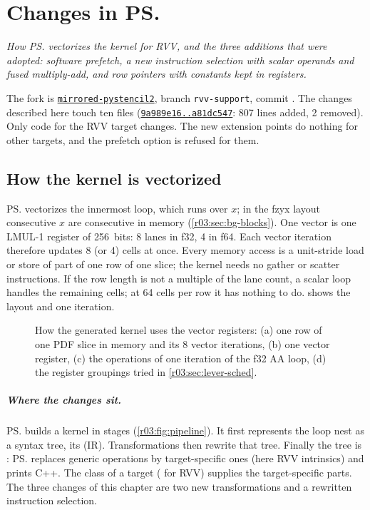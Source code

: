 \chapter{Changes in \texorpdfstring{\ps}{pystencils}}\label{r03:ch:pystencils}

\emph{How \ps{} vectorizes the kernel for RVV, and the three additions that were adopted:
software prefetch, a new instruction selection with scalar operands and fused multiply-add,
and row pointers with constants kept in registers.}

The fork is \href{\rPSurl/tree/\rPSsha}{\texttt{mirrored-pystencil2}}, branch
\texttt{rvv-support}, commit \rcommitps. The changes described here touch ten files
(\href{\rPSurl/compare/9a989e1625fbb0272876f550a5f7d3456fdaca25...\rPSsha}{\texttt{9a989e16..a81dc547}}:
807 lines added, 2 removed). Only code for the RVV target changes. The new extension points
do nothing for other targets, and the prefetch option is refused for them.

\section{How the kernel is vectorized}\label{r03:sec:ps-simd}

\ps{} vectorizes the innermost loop, which runs over $x$; in the fzyx layout consecutive $x$
are consecutive in memory (\cref{r03:sec:bg-blocks}). One vector is one LMUL-1 register of
256~bits: 8 lanes in f32, 4 in f64. Each vector iteration therefore updates 8 (or 4) cells at
once. Every memory access is a unit-stride load or store of part of one row of one slice; the
kernel needs no gather or scatter instructions. If the row length is not a multiple of the
lane count, a scalar loop handles the remaining cells; at 64 cells per row it has nothing to do.
 shows the layout and one iteration.

\begin{figure}[htbp]
  \centering
  \resizebox{\linewidth}{!}{}
  \caption[How the generated kernel uses the vector registers]{How the generated kernel uses
    the vector registers: (a) one row of one PDF slice in memory and its 8 vector iterations,
    (b) one vector register, (c) the operations of one iteration of the f32 AA loop, (d) the
    register groupings tried in \cref{r03:sec:lever-sched}.}\label{r03:fig:simd}
\end{figure}

\paragraph{Where the changes sit.} \ps{} builds a kernel in stages
(\cref{r03:fig:pipeline}). It first represents the loop nest as a syntax tree, its
 (IR). Transformations then rewrite that tree. Finally
the tree is : \ps{} replaces generic operations by target-specific ones
(here RVV intrinsics) and prints C++. The  class of a target ( for
RVV) supplies the target-specific parts. The three changes of this chapter are two new
transformations and a rewritten instruction selection.

